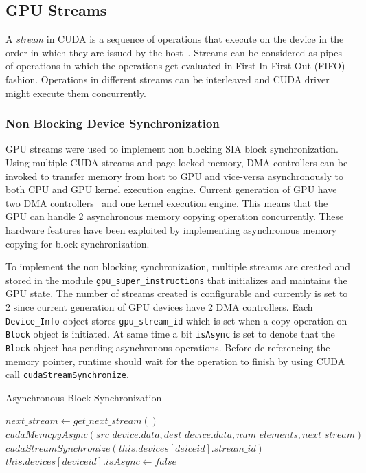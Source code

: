 \subsection{GPU Streams}
A \textit{stream} in CUDA is a sequence of operations that execute on the device
in the order in which they are issued by the host~\cite{overlapdatatransfer}.
Streams can be considered as pipes of operations in which the operations get evaluated in
First In First Out (FIFO) fashion. Operations in different streams can be interleaved
and CUDA driver might execute them concurrently.

\subsubsection{Non Blocking Device Synchronization}\label{nonblockdevicesync}
GPU streams were used to implement non blocking SIA block synchronization. Using
multiple CUDA streams and page locked memory, DMA controllers can be invoked to
transfer memory from host to GPU and vice-versa asynchronously to both CPU and GPU
kernel execution engine. Current generation of GPU have two DMA
controllers~\cite{teslaspecs}\cite{teslakspecs} and one kernel execution engine.
This means that the GPU can handle 2 asynchronous memory copying operation concurrently.
These hardware features have been exploited by implementing asynchronous memory
copying for block synchronization.

To implement the non blocking synchronization, multiple streams are created and
stored in the module \texttt{gpu\_super\_instructions} that initializes and
maintains the GPU state. The number of streams created is configurable and currently
is set to 2 since current generation of GPU devices have 2 DMA controllers. Each
\texttt{Device\_Info} object stores \texttt{gpu\_stream\_id} which is set when a
copy operation on \texttt{Block} object is initiated. At same time a bit
\texttt{isAsync} is set to denote that the \texttt{Block} object has pending
asynchronous operations. Before de-referencing the memory pointer, runtime should
wait for the operation to finish by using CUDA call \texttt{cudaStreamSynchronize}.

\begin{algorithm} {Asynchronous Block Synchronization}
  \singlespacing

  \begin{algorithmic}[1]
    \State $next\_stream \gets get\_next\_stream()$
    \State $cudaMemcpyAsync(src\_device.data, dest\_device.data, num\_elements, next\_stream)$
    \EndFunction
    \\
    \State $cudaStreamSynchronize(this.devices[deiceid].stream\_id)$
    \State $this.devices[deviceid].isAsync \gets false$
    \EndIf
    \State {}
    \EndFunction
  \end{algorithmic}
\end{algorithm}

